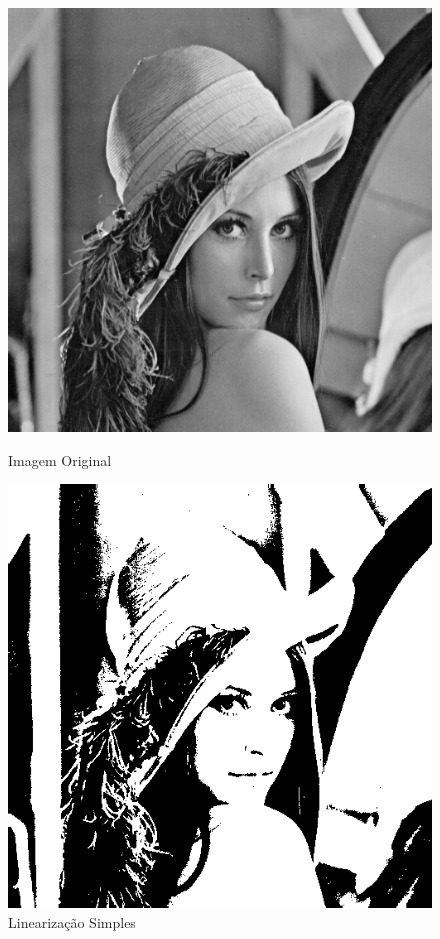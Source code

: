 \documentclass{article}
\begin{document}
\newpage

\begin{figure}[!htb]
\begin{minipage}[b]{0.45\linewidth}
\centering
\includegraphics[scale=0.32]{lena_B.png}
\caption{Imagem Original}
\label{fig:original}
\end{minipage}
\hspace{0.5cm}
\begin{minipage}[b]{0.45\linewidth}
\centering
\includegraphics[scale=0.32]{Linearizacao.png}
\caption{Linearização Simples}
\label{fig:rota}
\end{minipage}
\end{figure}
\end{document}
